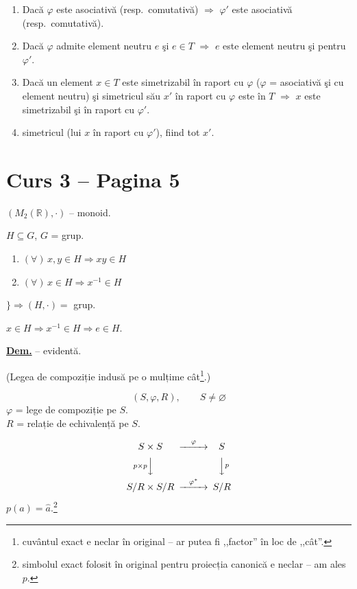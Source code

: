 \begin{enumerate}
\item[(1)] Dacă $\varphi$ este asociativă (resp.\ comutativă) $\Rightarrow$ $\varphi'$ este asociativă (resp.\ comutativă).
\item[(2)] Dacă $\varphi$ admite element neutru $e$ şi $e\in T$ $\Rightarrow$ $e$ este element neutru şi pentru $\varphi'$.
\item[(3)] Dacă un element $x\in T$ este simetrizabil în raport cu $\varphi$ ($\varphi$ = asociativă şi cu element neutru) şi simetricul său $x'$ în raport cu $\varphi$ este în $T$ $\Rightarrow$ $x$ este simetrizabil şi în raport cu $\varphi'$.
\item[(4)] simetricul (lui $x$ în raport cu $\varphi'$), fiind tot $x'$.
\end{enumerate}





\section*{Curs 3 -- Pagina 5}

\noindent $(M_2(\mathbb{R}),\cdot)$ -- monoid.

\noindent $H\subseteq G$, $G$ = grup.

\begin{enumerate}
\item[1)] $(\forall)\, x,y\in H \Rightarrow xy\in H$
\item[2)] $(\forall)\, x\in H \Rightarrow x^{-1}\in H$
\end{enumerate}
\hspace{1cm}$\Bigg\} \Rightarrow (H,\cdot) = $ grup.

\noindent $x\in H \Rightarrow x^{-1}\in H \Rightarrow e\in H$.

\bigskip
\noindent\underline{\textbf{Dem.}} -- evidentă.

\bigskip
\noindent (Legea de compoziție indusă pe o mulțime cât\footnote{cuvântul exact e neclar în original -- ar putea fi ,,factor'' în loc de ,,cât''.}.)

\[
(S,\varphi,R), \qquad S\neq\varnothing
\]
\noindent $\varphi$ = lege de compoziție pe $S$.\\
$R$ = relație de echivalență pe $S$.

\[
\begin{CD}
S\times S @>\varphi>> S\\
@V{p\times p}VV @VV{p}V\\
S/R\times S/R @>\varphi^*>> S/R
\end{CD}
\]
\noindent $p(a) = \hat a$.\footnote{simbolul exact folosit în original pentru proiecția canonică e neclar -- am ales $p$.}

